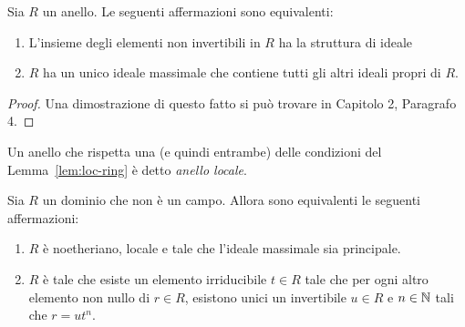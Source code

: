         \begin{lemma}\label{lem:loc-ring}
            Sia $R$ un anello. Le seguenti affermazioni sono equivalenti: 
            \begin{enumerate}[label = \alph*]
                \item L'insieme degli elementi non invertibili in $R$ ha la struttura di ideale
                \item $R$ ha un unico ideale massimale che contiene tutti gli altri ideali propri di $R$.
            \end{enumerate}
        \end{lemma}
        \begin{proof}
            Una dimostrazione di questo fatto si può trovare in \cite{fulton} Capitolo 2, Paragrafo 4.
            \begin{comment}
            Sia $M = \{r \in R : r \text{ non è un invertibile in } R\}$ un ideale di $R$. Allora, se $I \ideal R, I \neq R$, allora $I \subseteq
            M$, perché se esistesse $a \in I \setminus M$, allora $a$ sarebbe un invertibile di $R$, ma quindi $I = (a) = R$, contro l'ipotesi 
            che $I$ fosse ideale proprio. Quindi $M$ contiene tutti gli ideali propri di $R$ ed in particolare è massimale. \\
            Viceversa, sia $R$ che contiene un unico ideale massimale, che contiene tutti gli ideali propri di $R$ e sia $M$ tale ideale. Dimostro 
            che $$M = \{r \in R : r \text{ non è invertibile in } R\}$$ \\
            Sia $r \in M$, allora $r$ non è invertibile perché altrimenti $R = (r) \subseteq M$, ma $M$ è ideale proprio. Viceversa, se $r$ è un non 
            invertibile allora $I = (r)$ è un ideale proprio di $R$, quindi, $(r) \subseteq M \Longrightarrow r \in M$.
            \end{comment}
        \end{proof}
        Un anello che rispetta una (e quindi entrambe) delle condizioni del Lemma~\ref{lem:loc-ring} è detto \emph{anello locale}.\\
        \begin{lemma}\label{lem:DVR}
            Sia $R$ un dominio che non è un campo. Allora sono equivalenti le seguenti affermazioni: \begin{enumerate}[label = \alph*]
                \item $R$ è noetheriano, locale e tale che l'ideale massimale sia principale.
                \item $R$ è tale che esiste un elemento irriducibile $t \in R$ tale che per ogni altro elemento non nullo di $r \in R$, esistono unici 
                un invertibile $u \in R$ e $n \in \mathbb{N}$ tali che $r = ut^n$.
            \end{enumerate}
        \end{lemma}
